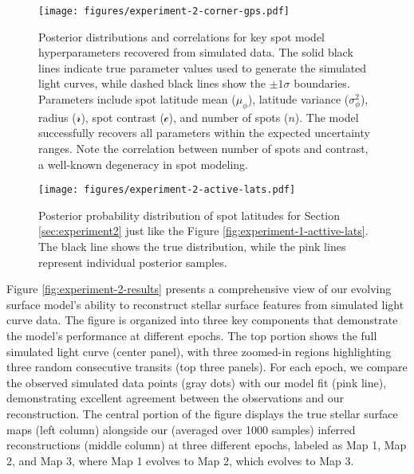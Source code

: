 \documentclass[twocolumn]{aastex631}
\begin{document}
%
\begin{figure*}[hbt!]
    \begin{centering}
        \texttt{[image: figures/experiment-2-corner-gps.pdf]}
        \caption{Posterior distributions and correlations for key spot model hyperparameters recovered from simulated data. 
        The solid black lines indicate true parameter values used to generate the simulated light curves, while dashed black 
        lines show the $\pm1\sigma$ boundaries. Parameters include spot latitude mean ($\mu_\phi$), latitude variance 
        ($\sigma^2_\phi$), radius ($\mathcal{r}$), spot contrast ($\mathcal{c}$), and number of spots ($n$). 
        The model successfully recovers all parameters within the expected uncertainty ranges.
         Note the correlation between number of spots and contrast, a well-known degeneracy in spot modeling.}
        \label{fig:experiment-2-corner}
    \end{centering}
\end{figure*}
%
%
\begin{figure*}[hbt!]
    \begin{centering}
        \texttt{[image: figures/experiment-2-active-lats.pdf]}
        \caption{Posterior probability distribution of spot latitudes for Section \ref{sec:experiment2} just like the Figure 
        \ref{fig:experiment-1-acttive-lats}. The black line shows the true distribution, 
        while the pink lines represent individual posterior samples.}
        \label{fig:experiment-2-active}
    \end{centering}
\end{figure*}
%
Figure \ref{fig:experiment-2-results} presents a comprehensive view of our evolving surface model's ability to reconstruct 
stellar surface features from simulated light curve data. The figure is organized into three key components that demonstrate 
the model's performance at different epochs.
The top portion shows the full simulated light curve (center panel), with three zoomed-in regions highlighting three random consecutive transits 
(top three panels). For each epoch, we compare the observed simulated data points (gray dots) with our model fit (pink line), 
demonstrating excellent agreement between the observations and our reconstruction.
The central portion of the figure displays the true stellar surface maps (left column) alongside our (averaged over 1000 samples) 
inferred reconstructions 
(middle column) at three different epochs, labeled as Map 1, Map 2, and Map 3, where Map 1 evolves to Map 2, which evolves to Map 3. 
\end{document}
